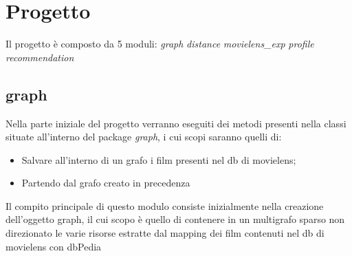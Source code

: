 \section{Progetto}
\label{project}
Il progetto è composto da 5 moduli:
\emph{graph}
\emph{distance}
\emph{movielens_exp}
\emph{profile}
\emph{recommendation}
\wedge
\subsection{graph}
Nella parte iniziale del progetto verranno eseguiti dei metodi presenti nella classi situate all'interno del package \emph{graph}, i cui scopi saranno quelli di: 
\begin{itemize}
\item Salvare all'interno di un grafo i film presenti nel db di movielens;
\item Partendo dal grafo creato in precedenza     
\end{itemize}



Il compito principale di questo modulo consiste inizialmente nella creazione dell'oggetto graph, il cui scopo è quello di contenere in un multigrafo sparso non direzionato le varie risorse estratte dal mapping dei film contenuti nel db di movielens con dbPedia

